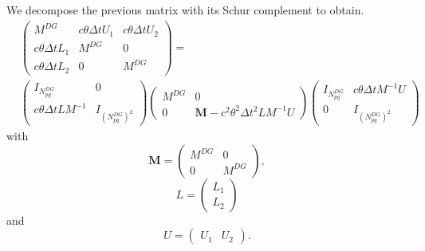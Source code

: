 \documentclass[a4paper, 11pt]{report}
\begin{document}
We decompose the previous matrix with its Schur complement to obtain.
\begin{equation*}
\begin{split}
&\begin{pmatrix}
M^{DG}& c\theta\Delta t U_1 & c\theta\Delta t U_2\\
c\theta\Delta t L_1 & M^{DG}&0\\
c\theta\Delta t L_2&0&M^{DG}
\end{pmatrix}=\\
&\begin{pmatrix}
I_{N_{pg}^{DG}}& 0 \\
c\theta\Delta tLM^{-1} & I_{(N_{pg}^{DG})^2}
\end{pmatrix}
\begin{pmatrix}
M^{DG}& 0\\
0 & \boldsymbol{M}-c^2\theta^2\Delta t^2LM^{-1}U
\end{pmatrix}
\begin{pmatrix}
I_{N_{pg}^{DG}}& c\theta\Delta t M^{-1}U\\
0 & I_{(N_{pg}^{DG})^2}
\end{pmatrix}
\end{split}
\end{equation*}
with
\begin{equation*}
\boldsymbol{M}=\begin{pmatrix}M^{DG}&0\\0&M^{DG}\end{pmatrix},
\end{equation*}
\begin{equation*}
L=\begin{pmatrix}L_1\\L_2\end{pmatrix}
\end{equation*}
and
\begin{equation*}
U=\begin{pmatrix}U_1 & U_2\end{pmatrix}.
\end{equation*}
\end{document}
